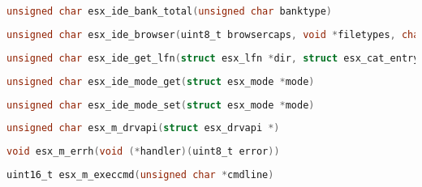 \documentclass[11pt]{book}
\def\lthtmlcheckvsize{\ifdim\ht\sizebox<\vsize 
  \ifdim\wd\sizebox<\hsize\expandafter\hfill\fi \expandafter\vfill
  \else\expandafter\vss\fi}%
\begin{document}
{\newpage\clearpage
{}%
\begin{lstlisting}[language=C]
unsigned char esx_ide_bank_total(unsigned char banktype)
\end{lstlisting}%
\lthtmlfigureZ
\lthtmlcheckvsize\clearpage}

{\newpage\clearpage
{}%
\begin{lstlisting}[language=C]
unsigned char esx_ide_browser(uint8_t browsercaps, void *filetypes, char *help,char *dst_sfn, char *dst_lfn)
\end{lstlisting}%
\lthtmlfigureZ
\lthtmlcheckvsize\clearpage}

{\newpage\clearpage
{}%
\begin{lstlisting}[language=C]
unsigned char esx_ide_get_lfn(struct esx_lfn *dir, struct esx_cat_entry *query)
\end{lstlisting}%
\lthtmlfigureZ
\lthtmlcheckvsize\clearpage}

{\newpage\clearpage
{}%
\begin{lstlisting}[language=C]
unsigned char esx_ide_mode_get(struct esx_mode *mode)
\end{lstlisting}%
\lthtmlfigureZ
\lthtmlcheckvsize\clearpage}

{\newpage\clearpage
{}%
\begin{lstlisting}[language=C]
unsigned char esx_ide_mode_set(struct esx_mode *mode)
\end{lstlisting}%
\lthtmlfigureZ
\lthtmlcheckvsize\clearpage}

{\newpage\clearpage
{}%
\begin{lstlisting}[language=C]
unsigned char esx_m_drvapi(struct esx_drvapi *)
\end{lstlisting}%
\lthtmlfigureZ
\lthtmlcheckvsize\clearpage}

{\newpage\clearpage
{}%
\begin{lstlisting}[language=C]
void esx_m_errh(void (*handler)(uint8_t error))
\end{lstlisting}%
\lthtmlfigureZ
\lthtmlcheckvsize\clearpage}

{\newpage\clearpage
{}%
\begin{lstlisting}[language=C]
uint16_t esx_m_execcmd(unsigned char *cmdline)
\end{lstlisting}%
\lthtmlfigureZ
\lthtmlcheckvsize\clearpage}
\end{document}

